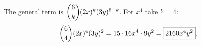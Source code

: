The general term is $\dbinom6k(2x)^k(3y)^{6-k}$. For $x^4$ take $k=4$:
\[\dbinom64(2x)^4(3y)^2=15\cdot16x^4\cdot 9y^2=\boxed{2160x^4y^2}.\]

